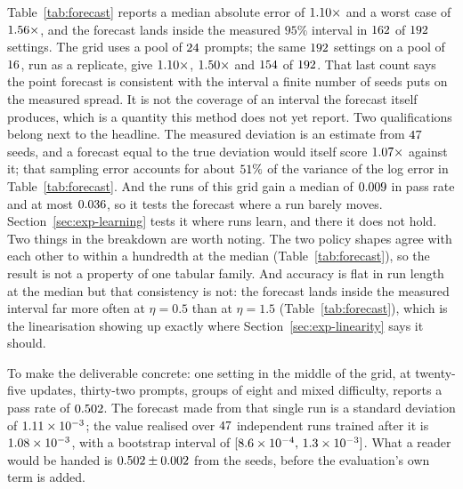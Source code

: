 \begin{table}[t]
  \centering
  \small
  
  \caption{Forecast against realised spread. The error is $|\log(\text{predicted}/\text{measured})|$
  exponentiated; the last column counts settings where the forecast falls inside the bootstrap interval of
  the measured standard deviation over $\numForecastSeeds$ runs, which is consistency with that
  interval rather than the coverage of an interval the forecast itself produces.}
  \label{tab:forecast}
\end{table}

Table~\ref{tab:forecast} reports a median absolute error of $1.10\times$ and a worst case of
$1.56\times$, and the forecast lands inside the measured $95\%$ interval in $162$ of $192$
settings. The grid uses a pool of $24$ prompts; the same $192$
settings on a pool of $16$, run as a replicate, give
$1.10\times$, $1.50\times$ and
$154$ of $192$. That last count says the point forecast is consistent with the interval a finite number
of seeds puts on the measured spread. It is not the coverage of an interval the forecast itself
produces, which is a quantity this method does not yet report.
Two qualifications belong next to the headline. The measured deviation is an estimate from
$\numForecastSeeds$ seeds, and a forecast equal to the true deviation would itself score
$1.07\times$ against it; that sampling error accounts for about
$51\%$ of the variance of the log error in Table~\ref{tab:forecast}. And the
runs of this grid gain a median of $0.009$ in pass rate and at most
$0.036$, so it tests the forecast where a run barely moves.
Section~\ref{sec:exp-learning} tests it where runs learn, and there it does not hold.
Two things in the breakdown are worth noting. The two policy shapes agree with each other
to within a hundredth at the median (Table~\ref{tab:forecast}), so the result is not a property of
one tabular family.
And accuracy is flat in run length at the median but that consistency is not: the forecast lands
inside the measured interval far more often at $\eta = 0.5$ than at $\eta = 1.5$
(Table~\ref{tab:forecast}), which is the linearisation showing up exactly
where Section~\ref{sec:exp-linearity} says it should.

To make the deliverable concrete: one setting in the middle of the grid, at twenty-five updates,
thirty-two prompts, groups of eight and mixed difficulty, reports a pass rate of
$0.502$. The forecast made from that single run is a standard deviation of
$1.11\times10^{-3}$; the value realised over $47$ independent runs trained after
it is $1.08\times10^{-3}$, with a bootstrap interval of $[8.6\times10^{-4},\, 1.3\times10^{-3}]$.
What a reader would be handed is $0.502 \pm 0.002$ from the seeds, before
the evaluation's own term is added.

